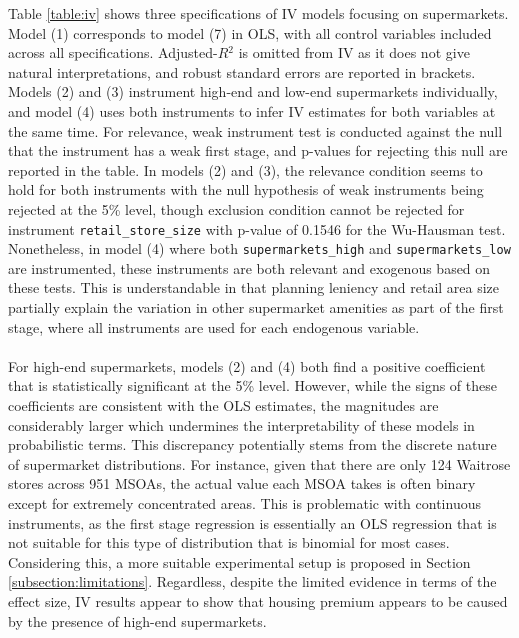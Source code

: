\documentclass{article}
\begin{document}
Table \ref{table:iv} shows three specifications of IV models focusing on supermarkets. Model (1) corresponds to model (7) in OLS, with all control variables included across all specifications. Adjusted-$R{^2}$ is omitted from IV as it does not give natural interpretations, and robust standard errors are reported in brackets. Models (2) and (3) instrument high-end and low-end supermarkets individually, and model (4) uses both instruments to infer IV estimates for both variables at the same time. For relevance, weak instrument test is conducted against the null that the instrument has a weak first stage, and p-values for rejecting this null are reported in the table. In models (2) and (3), the relevance condition seems to hold for both instruments with the null hypothesis of weak instruments being rejected at the 5\% level, though exclusion condition cannot be rejected for instrument \texttt{retail\_store\_size} with p-value of 0.1546 for the  Wu-Hausman test. Nonetheless, in model (4) where both \texttt{supermarkets\_high} and \texttt{supermarkets\_low} are instrumented, these instruments are both relevant and exogenous based on these tests. This is understandable in that planning leniency and retail area size partially explain the variation in other supermarket amenities as part of the first stage, where all instruments are used for each endogenous variable.\\\\
For high-end supermarkets, models (2) and (4) both find a positive coefficient that is statistically significant at the 5\% level. However, while the signs of these coefficients are consistent with the OLS estimates, the magnitudes are considerably larger which undermines the interpretability of these models in probabilistic terms. This discrepancy potentially stems from the discrete nature of supermarket distributions. For instance, given that there are only 124 Waitrose stores across 951 MSOAs, the actual value each MSOA takes is often binary except for extremely concentrated areas. This is problematic with continuous instruments, as the first stage regression is essentially an OLS regression that is not suitable for this type of distribution that is binomial for most cases. Considering this, a more suitable experimental setup is proposed in Section \ref{subsection:limitations}. Regardless, despite the limited evidence in terms of the effect size, IV results appear to show that housing premium appears to be caused by the presence of high-end supermarkets.\\\\
\end{document}
